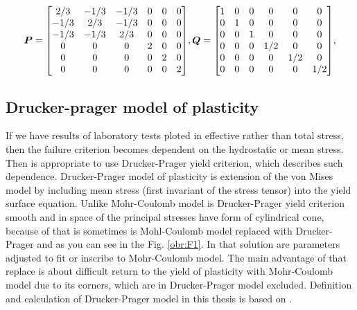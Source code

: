 \begin{equation}
	\boldsymbol{P} = \mqty[	2/3 & -1/3 & -1/3 & 0 & 0 & 0\\ 
				-1/3 & 2/3 & -1/3 & 0 & 0 & 0\\
				-1/3 & -1/3 & 2/3 & 0 & 0 & 0\\
				0 & 0 & 0 & 2 & 0 & 0\\
				0 & 0 & 0 & 0 & 2 & 0\\
				0 & 0 & 0 & 0 & 0 & 2\\],	\boldsymbol{Q} = \mqty[	1 & 0 & 0 & 0 & 0 & 0\\
				0 & 1 & 0 & 0 & 0 & 0\\
				0 & 0 & 1 & 0 & 0 & 0\\
				0 & 0 & 0 & 1/2 & 0 & 0\\
				0 & 0 & 0 & 0 & 1/2 & 0\\
				0 & 0 & 0 & 0 & 0 & 1/2\\],
\end{equation}





\subsection{Drucker-prager model of plasticity}\label{sec:drucker-prager_introduction}
\indent

If we have results of laboratory tests ploted in effective rather than total stress, then the failure criterion becomes dependent on the hydrostatic or mean stress. Then is appropriate to use Drucker-Prager yield criterion, which describes such dependence. Drucker-Prager model of plasticity is extension of the von Mises model by including mean stress (first invariant of the stress tensor) into the yield surface equation. Unlike Mohr-Coulomb model is Drucker-Prager yield criterion smooth and in space of the principal stresses have form of cylindrical cone, because of that is sometimes is Mohl-Coulomb model replaced with Drucker-Prager and as you can see in the Fig. \ref{obr:F1}. In that solution are parameters adjusted to fit or inscribe to Mohr-Coulomb model. The main advantage of that replace is about difficult return to the yield of plasticity with Mohr-Coulomb model due to its corners, which are in Drucker-Prager model excluded. Definition and calculation of Drucker-Prager model in this thesis is based on \cite{geofem}.   

